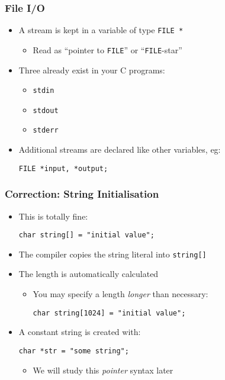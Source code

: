 \documentclass[14pt]{beamer}
\begin{document}
\begin{frame}[fragile]
\frametitle{File I/O}
\begin{itemize}
\item A stream is kept in a variable of type \texttt{FILE~*}
	\begin{itemize}
		\item Read as ``pointer to \texttt{FILE}'' or ``\texttt{FILE}-star''
	\end{itemize}
\item Three already exist in your C programs:
	\begin{itemize}
		\item \texttt{stdin}
		\item \texttt{stdout}
		\item \texttt{stderr}
	\end{itemize}
\item Additional streams are declared like other variables, eg:
\begin{lstlisting}[style=CStyle]
FILE *input, *output;
\end{lstlisting}
\end{itemize}
\end{frame}

\begin{frame}[fragile]
\frametitle{Correction: String Initialisation}
\begin{itemize}
\item This is totally fine:
\begin{lstlisting}[style=CStyle]
char string[] = "initial value";
\end{lstlisting}
\item The compiler copies the string literal into \texttt{string[]}
\item The length is automatically calculated
	\begin{itemize}
		\item You may specify a length \textit{longer} than necessary:
\begin{lstlisting}[style=CStyle]
char string[1024] = "initial value";			
\end{lstlisting}
	\end{itemize}
\pause
\item A constant string is created with:
\begin{lstlisting}[style=CStyle]
char *str = "some string";
\end{lstlisting}
	\begin{itemize}
		\item We will study this \textit{pointer} syntax later
	\end{itemize}
\end{itemize}
\end{frame}
\end{document}

